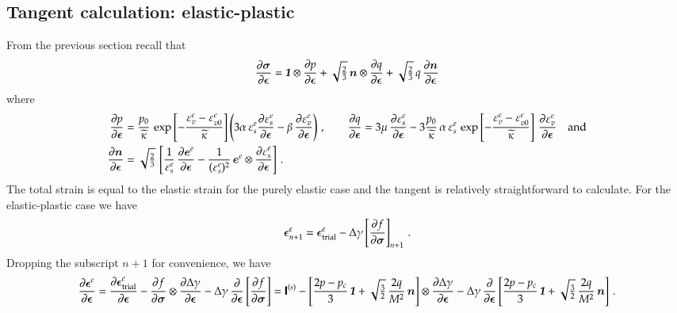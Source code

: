 \documentclass[twoside,10pt,a4paper]{article}
\begin{document}
\subsection{Tangent calculation: elastic-plastic}
From the previous section recall that 
\[
   \Partial{\Bsig}{\Beps} = \Bone\otimes\Partial{p}{\Beps} + 
      \sqrt{\tfrac{2}{3}}\,\BnT\otimes\Partial{q}{\Beps} + 
      \sqrt{\tfrac{2}{3}}\,q\,\Partial{\BnT}{\Beps}  
\]
where
\[
  \Bal
  \Partial{p}{\Beps} & = \frac{p_0}{\kappatilde}\,
      \exp\left[-\frac{\Ve^e_v - \Ve^e_{v0}}{\kappatilde}\right]\left(3\alpha\,\Ve^e_s\Partial{\Ve^e_s}{\Beps} -
            \beta\,\Partial{\Ve^e_v}{\Beps} \right) \,,\qquad
  \Partial{q}{\Beps}  = 3\mu\,\Partial{\Ve^e_s}{\Beps} - 3\frac{p_0}{\kappatilde}\,\alpha\,\Ve^e_s \,
      \exp\left[-\frac{\Ve^e_v - \Ve^e_{v0}}{\kappatilde}\right]\,\Partial{\Ve^e_v}{\Beps} \quad \Tand \\
   \Partial{\BnT}{\Beps} & = \sqrt{\tfrac{2}{3}}\,\left[\frac{1}{\Ve^e_s}\,\Partial{\BeT^e}{\Beps}
     - \frac{1}{(\Ve^e_s)^2}\,\BeT^e\otimes\Partial{\Ve^e_s}{\Beps}\right] \,.
  \Eal
\]
The total strain is equal to the elastic strain for the purely elastic case and the tangent is relatively
straightforward to calculate.  For the elastic-plastic case we have
\[
   \Beps^e_{n+1} = \Beps^e_\Trial - \Delta\gamma\left[\Partial{f}{\Bsig}\right]_{n+1} \,.
\]
Dropping the subscript $n+1$ for convenience, we have
\[
   \Partial{\Beps^e}{\Beps} = \Partial{\Beps^e_\Trial}{\Beps} 
     - \Partial{f}{\Bsig}\otimes\Partial{\Delta\gamma}{\Beps}
     - \Delta\gamma\,\Partial{}{\Beps}\left[\Partial{f}{\Bsig}\right]
     = \SfI^{(s)}
     - \left[\frac{2p-p_c}{3}\,\Bone + \sqrt{\tfrac{3}{2}}\,\frac{2q}{M^2}\,\BnT\right]
       \otimes\Partial{\Delta\gamma}{\Beps}
     - \Delta\gamma\,\Partial{}{\Beps}
     \left[\frac{2p-p_c}{3}\,\Bone + \sqrt{\tfrac{3}{2}}\,\frac{2q}{M^2}\,\BnT\right] \,.
\]


\end{document}
